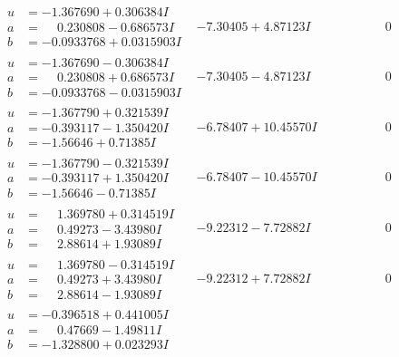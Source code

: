 \documentclass[1p]{elsarticle_modified}
\theoremstyle{definition}
\begin{document}
$$\begin{array}{c|c|c}
 \hline 
\begin{aligned}
u &= -1.367690 + 0.306384 I \\
a &= \phantom{-}0.230808 - 0.686573 I \\
b &= -0.0933768 + 0.0315903 I\end{aligned}
 & -7.30405 + 4.87123 I & \phantom{-0.000000 } 0 \\ \hline\begin{aligned}
u &= -1.367690 - 0.306384 I \\
a &= \phantom{-}0.230808 + 0.686573 I \\
b &= -0.0933768 - 0.0315903 I\end{aligned}
 & -7.30405 - 4.87123 I & \phantom{-0.000000 } 0 \\ \hline\begin{aligned}
u &= -1.367790 + 0.321539 I \\
a &= -0.393117 - 1.350420 I \\
b &= -1.56646 + 0.71385 I\end{aligned}
 & -6.78407 + 10.45570 I & \phantom{-0.000000 } 0 \\ \hline\begin{aligned}
u &= -1.367790 - 0.321539 I \\
a &= -0.393117 + 1.350420 I \\
b &= -1.56646 - 0.71385 I\end{aligned}
 & -6.78407 - 10.45570 I & \phantom{-0.000000 } 0 \\ \hline\begin{aligned}
u &= \phantom{-}1.369780 + 0.314519 I \\
a &= \phantom{-}0.49273 - 3.43980 I \\
b &= \phantom{-}2.88614 + 1.93089 I\end{aligned}
 & -9.22312 - 7.72882 I & \phantom{-0.000000 } 0 \\ \hline\begin{aligned}
u &= \phantom{-}1.369780 - 0.314519 I \\
a &= \phantom{-}0.49273 + 3.43980 I \\
b &= \phantom{-}2.88614 - 1.93089 I\end{aligned}
 & -9.22312 + 7.72882 I & \phantom{-0.000000 } 0 \\ \hline\begin{aligned}
u &= -0.396518 + 0.441005 I \\
a &= \phantom{-}0.47669 - 1.49811 I \\
b &= -1.328800 + 0.023293 I\end{aligned}

\end{array}$$
\end{document}
